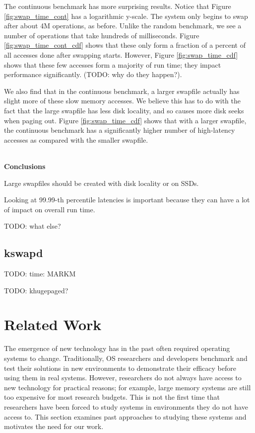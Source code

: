 \documentclass[twocolumn,11pt]{article}
\begin{document}
The continuous benchmark has more surprising results. Notice that Figure
\ref{fig:swap_time_cont} has a logarithmic y-scale. The system only begins to
swap after about 4M operations, as before. Unlike the random benchmark, we see a
number of operations that take hundreds of milliseconds. Figure
\ref{fig:swap_time_cont_cdf} shows that these only form a fraction of a percent
of all accesses done after swapping starts. However, Figure
\ref{fig:swap_time_cdf} shows that these few accesses form a majority of run
time; they impact performance significantly. (TODO: why do they happen?).

We also find that in the continuous benchmark, a larger swapfile actually has
slight more of these slow memory accesses. We believe this has to do with the
fact that the large swapfile has less disk locality, and so causes more disk
seeks when paging out. Figure \ref{fig:swap_time_cdf} shows that with a larger
swapfile, the continuous benchmark has a significantly higher number of
high-latency accesses as compared with the smaller swapfile.

~\\ \textbf{Conclusions} 

Large swapfiles should be created with disk locality or on SSDs.

Looking at 99.99-th percentile latencies is important because they can have a
lot of impact on overall run time.

TODO: what else?

\subsection{kswapd}

TODO: time: MARKM

TODO: khugepaged?


\section{Related Work}

The emergence of new technology has in the past often required operating systems
to change. Traditionally, OS researchers and developers benchmark and test their
solutions in new environments to demonstrate their efficacy before using them in
real systems. However, researchers do not always have access to new technology
for practical reasons; for example, large memory systems are still too expensive
for most research budgets. This is not the first time that researchers have been
forced to study systems in environments they do not have access to. This section
examines past approaches to studying these systems and motivates the need for
our work.
\end{document}
